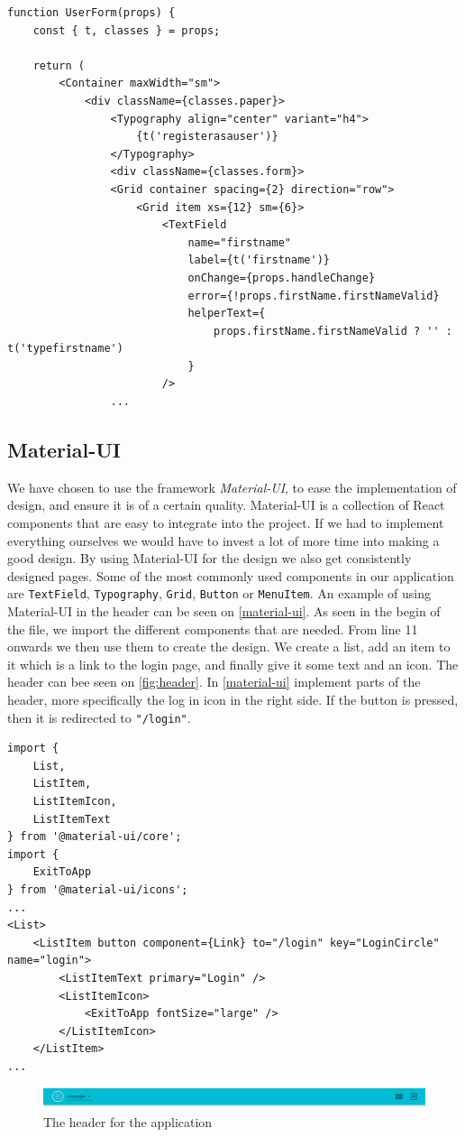 \begin{lstlisting}[caption={Presentational component for userform}, captionpos=b, label={user-form}]
function UserForm(props) {
    const { t, classes } = props;
    
    return (
        <Container maxWidth="sm">
            <div className={classes.paper}>
                <Typography align="center" variant="h4">
                    {t('registerasauser')}
                </Typography>
                <div className={classes.form}>
                <Grid container spacing={2} direction="row">
                    <Grid item xs={12} sm={6}>
                        <TextField
                            name="firstname"
                            label={t('firstname')}
                            onChange={props.handleChange}
                            error={!props.firstName.firstNameValid}
                            helperText={
                                props.firstName.firstNameValid ? '' : t('typefirstname')
                            }
                        />
                ...
\end{lstlisting}

\subsection{Material-UI}
We have chosen to use the framework \textit{Material-UI}, to ease the implementation of design, and ensure it is of a certain quality.
Material-UI is a collection of React components that are easy to integrate into the project.
If we had to implement everything ourselves we would have to invest a lot of more time into making a good design.
By using Material-UI for the design we also get consistently designed pages.
Some of the most commonly used components in our application are \texttt{TextField}, \texttt{Typography}, \texttt{Grid}, \texttt{Button} or \texttt{MenuItem}.
An example of using Material-UI in the header can be seen on \autoref{material-ui}.
As seen in the begin of the file, we import the different components that are needed.
From line 11 onwards we then use them to create the design.
We create a list, add an item to it which is a link to the login page, and finally give it some text and an icon.
The header can bee seen on \autoref{fig:header}.
In \autoref{material-ui} implement parts of the header, more specifically the log in icon in the right side.
If the button is pressed, then it is redirected to \texttt{"/login"}.
\begin{lstlisting}[caption={Use of material-ui in the header}, captionpos=b, label={material-ui}]
import {
    List,
    ListItem,
    ListItemIcon,
    ListItemText
} from '@material-ui/core';
import {
	ExitToApp
} from '@material-ui/icons';
...
<List>
    <ListItem button component={Link} to="/login" key="LoginCircle" name="login">
        <ListItemText primary="Login" />
        <ListItemIcon>
            <ExitToApp fontSize="large" />
        </ListItemIcon>
    </ListItem>
...
\end{lstlisting}


\begin{figure}[H]
    \includegraphics[width=\linewidth]{figures/header.png}
    \caption{The header for the application}
    \label{fig:header}
\end{figure}
  
